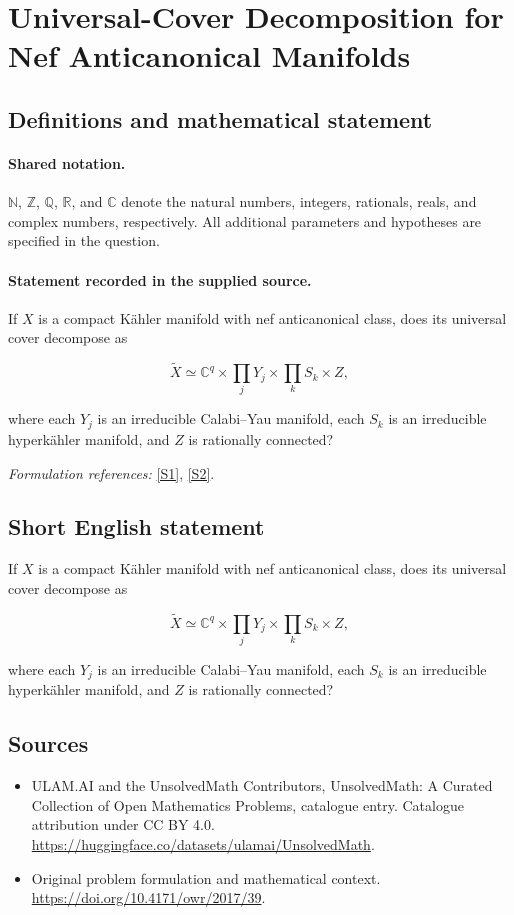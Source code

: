 \documentclass[11pt]{article}
\newcommand{\sref}[2]{\hyperlink{source:#1:#2}{[S#2]}}
\begin{document}
\section{Universal-Cover Decomposition for Nef Anticanonical Manifolds}\label{statement}

\subsection{Definitions and mathematical statement}

\paragraph{Shared notation.}$\mathbb N$, $\mathbb Z$, $\mathbb Q$, $\mathbb R$, and $\mathbb C$ denote the natural numbers, integers, rationals, reals, and complex numbers, respectively. All additional parameters and hypotheses are specified in the question.


\paragraph{Statement recorded in the supplied source.}
If $X$ is a compact Kähler manifold with nef anticanonical class, does its universal cover decompose as

$$\widetilde X\simeq\mathbb C^q\times\prod_jY_j\times\prod_kS_k\times Z,$$

where each $Y_j$ is an irreducible Calabi–Yau manifold, each $S_k$ is an irreducible hyperkähler manifold, and $Z$ is rationally connected?
\par\smallskip\textit{Formulation references:} \sref{statement}{1}, \sref{statement}{2}.
\subsection{Short English statement}
If $X$ is a compact Kähler manifold with nef anticanonical class, does its universal cover decompose as

$$\widetilde X\simeq\mathbb C^q\times\prod_jY_j\times\prod_kS_k\times Z,$$

where each $Y_j$ is an irreducible Calabi–Yau manifold, each $S_k$ is an irreducible hyperkähler manifold, and $Z$ is rationally connected?
\subsection{Sources}
\begin{itemize}
\item[\hypertarget{source:statement:1}{S1}] ULAM.AI and the UnsolvedMath Contributors, UnsolvedMath: A Curated Collection of Open Mathematics Problems, catalogue entry. Catalogue attribution under CC BY 4.0.
\url{https://huggingface.co/datasets/ulamai/UnsolvedMath}.
\item[\hypertarget{source:statement:2}{S2}] Original problem formulation and mathematical context.
\url{https://doi.org/10.4171/owr/2017/39}.
\end{itemize}
\label{end:statement}
\end{document}
